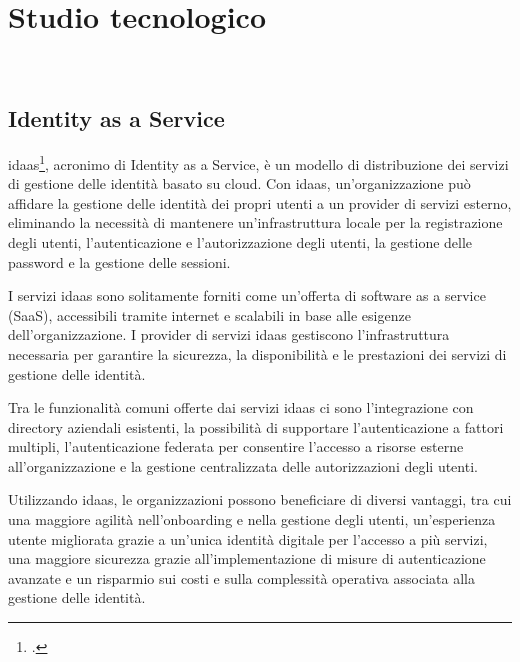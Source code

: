 
\chapter{Studio tecnologico}
\label{cap:studio-tecnologico}

\\


\section{Identity as a Service}

\acrshort{idaas}\footcite{site:idaas}, acronimo di Identity as a Service, è un modello di distribuzione dei servizi di gestione delle identità basato su cloud. Con \acrshort{idaas}, un'organizzazione può affidare la gestione delle identità dei propri utenti a un provider di servizi esterno, eliminando la necessità di mantenere un'infrastruttura locale per la registrazione degli utenti, l'autenticazione e l'autorizzazione degli utenti, la gestione delle password e la gestione delle sessioni.

I servizi \acrshort{idaas} sono solitamente forniti come un'offerta di software as a service (SaaS), accessibili tramite internet e scalabili in base alle esigenze dell'organizzazione. I provider di servizi \acrshort{idaas} gestiscono l'infrastruttura necessaria per garantire la sicurezza, la disponibilità e le prestazioni dei servizi di gestione delle identità.

Tra le funzionalità comuni offerte dai servizi \acrshort{idaas} ci sono l'integrazione con directory aziendali esistenti, la possibilità di supportare l'autenticazione a fattori multipli, l'autenticazione federata per consentire l'accesso a risorse esterne all'organizzazione e la gestione centralizzata delle autorizzazioni degli utenti.

Utilizzando \acrshort{idaas}, le organizzazioni possono beneficiare di diversi vantaggi, tra cui una maggiore agilità nell'onboarding e nella gestione degli utenti, un'esperienza utente migliorata grazie a un'unica identità digitale per l'accesso a più servizi, una maggiore sicurezza grazie all'implementazione di misure di autenticazione avanzate e un risparmio sui costi e sulla complessità operativa associata alla gestione delle identità.

